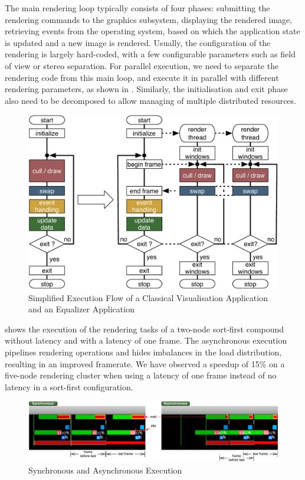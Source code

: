 The main rendering loop typically consists of four phases: submitting the
rendering commands to the graphics subsystem, displaying the rendered image,
retrieving events from the operating system, based on which the application
state is updated and a new image is rendered. Usually, the configuration of
the rendering is largely hard-coded, with a few configurable parameters such as
field of view or stereo separation. For parallel execution, we need to separate
the rendering code from this main loop, and execute it in parallel with
different rendering parameters, as shown in . Similarly, the
initialisation and exit phase also need to be decomposed to allow managing of
multiple distributed resources.

\begin{figure}[ht]\center
 \includegraphics[width=.9\columnwidth]{images/executionFlow}
 \caption{Simplified Execution Flow of a Classical Visualisation Application
  and an Equalizer Application}
 \label{FIG_execution}
\end{figure}

 shows the execution of the rendering tasks of a two-node
sort-first compound without latency and with a latency of one frame. The
asynchronous execution pipelines rendering operations and hides imbalances in
the load distribution, resulting in an improved framerate. We have observed a
speedup of 15\% on a five-node rendering cluster when using a latency of one
frame instead of no latency in a sort-first configuration.

\begin{figure}[h!t]\center
 \includegraphics[width=\textwidth]{images/syncAsync}
 {\caption{\label{fSyncAsync}Synchronous and Asynchronous Execution}}
\end{figure}

